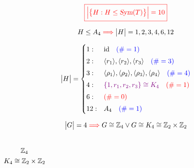 \begin{frame}
  \[
	\textcolor{red}{\boxed{\Big\lvert \big\{H: H \le \textsl{Sym}(T)\big\} \Big\rvert = 10}}
  \]

  \pause
  \[
	H \le A_4 \textcolor{red}{\implies} \big\lvert H \big\rvert = 1, 2, 3, 4, 6, 12
  \]

  \pause
  \[
	\big\lvert H \big\rvert = \begin{cases}
	  1: & \text{id} \quad \textcolor{blue}{(\# = 1)} \\[3pt]
	  2: & \langle r_1 \rangle, \langle r_2 \rangle, \langle r_3 \rangle \quad \textcolor{blue}{(\# = 3)} \\[3pt]
	  3: & \langle \rho_1 \rangle, \langle \rho_2 \rangle, \langle \rho_3 \rangle, \langle \rho_4 \rangle \quad \textcolor{blue}{(\# = 4)} \\[3pt]
	  4: & \textcolor{violet}{\left\{1, r_1, r_2, r_3\right\} \cong K_4} \quad \textcolor{red}{(\# = 1)} \\[3pt]
	  6: & \textcolor{red}{(\# = 0)} \\[3pt]
	  12: & A_4 \quad \textcolor{blue}{(\# = 1)}
	\end{cases}
  \]

\end{frame}

\begin{frame}
  \begin{theorem}
	\[
	  \big\lvert G \big\rvert = 4 \textcolor{red}{\implies} G \cong \mathbb{Z}_{4} \lor G \cong K_4 \cong \mathbb{Z}_{2} \times \mathbb{Z}_{2}
	\]
  \end{theorem}

  \pause
  \begin{columns}
	  \[
		\mathbb{Z}_{4}
	  \]
	  \[
		K_4 \cong \mathbb{Z}_{2} \times \mathbb{Z}_{2}
	  \]
  \end{columns}
\end{frame}

